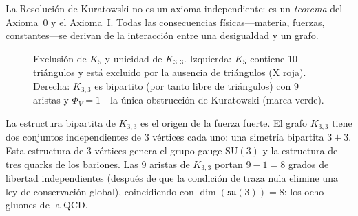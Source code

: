 \documentclass[11pt, a4paper, openany]{book}
\begin{document}
\noindent
La Resoluci\'on de Kuratowski no es un axioma independiente: es un
\emph{teorema} del Axioma~0 y el Axioma~I. Todas las consecuencias
f\'isicas---materia, fuerzas, constantes---se derivan de la interacci\'on
entre una desigualdad y un grafo.

\begin{figure}[ht]
\centering
{}
\caption{Exclusi\'on de $K_5$ y unicidad de $K_{3,3}$.
Izquierda: $K_5$ contiene 10 tri\'angulos y est\'a excluido por la
ausencia de tri\'angulos (X roja).
Derecha: $K_{3,3}$ es bipartito (por tanto libre de tri\'angulos) con
9 aristas y $\Phi_V = 1$---la \'unica obstrucci\'on de Kuratowski
(marca verde).}
\label{fig:k5-k33}
\end{figure}

La estructura bipartita de $K_{3,3}$ es el origen de la fuerza fuerte.
El grafo $K_{3,3}$ tiene dos conjuntos independientes de 3 v\'ertices
cada uno: una simetr\'ia bipartita $3 + 3$. Esta estructura de 3
v\'ertices genera el grupo gauge $\mathrm{SU}(3)$ y la estructura de
tres quarks de los bariones. Las 9 aristas de $K_{3,3}$ portan
$9 - 1 = 8$ grados de libertad independientes (despu\'es de que la
condici\'on de traza nula elimine una ley de conservaci\'on global),
coincidiendo con $\dim(\mathfrak{su}(3)) = 8$: los ocho gluones de la
QCD.
\end{document}
